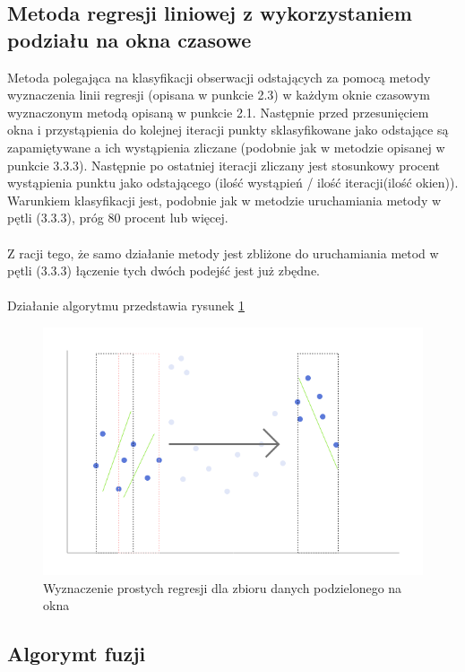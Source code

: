 \documentclass[eng,printmode]{mgr}
\begin{document}
\subsection{Metoda regresji liniowej z wykorzystaniem podziału na okna czasowe}
Metoda polegająca na klasyfikacji obserwacji odstających za pomocą metody wyznaczenia linii regresji (opisana w punkcie 2.3) w każdym oknie czasowym wyznaczonym metodą opisaną w punkcie 2.1. Następnie przed przesunięciem okna i przystąpienia do kolejnej iteracji punkty sklasyfikowane jako odstające są zapamiętywane a ich wystąpienia zliczane (podobnie jak w metodzie opisanej w punkcie 3.3.3). Następnie po ostatniej iteracji zliczany jest stosunkowy procent wystąpienia punktu jako odstającego (ilość wystąpień / ilość iteracji(ilość okien)). Warunkiem klasyfikacji jest, podobnie jak w metodzie uruchamiania metody w pętli (3.3.3), próg 80 procent lub więcej. \\\\
Z racji tego, że samo działanie metody jest zbliżone do uruchamiania metod w pętli (3.3.3) łączenie tych dwóch podejść jest już zbędne.
\\\\
Działanie algorytmu przedstawia rysunek \ref{fig:reg_windowed}
\begin{figure}[H]
  \begin{center}
  \includegraphics[scale=0.7]{reg_windowed}
  \end{center}
  \caption{Wyznaczenie prostych regresji dla zbioru danych podzielonego na okna}
  \label{fig:reg_windowed}
\end{figure}


\subsection{Algorymt fuzji}
\end{document}
